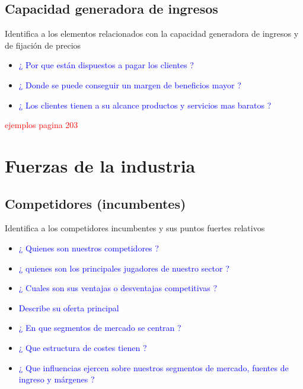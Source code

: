 \documentclass[11pt]{book}
\begin{document}
\subsection{Capacidad generadora de ingresos}
Identifica a los elementos relacionados con la capacidad generadora de ingresos y de fijación de precios
\begin{itemize}
\item\textcolor{blue}{ ¿ Por que están dispuestos a pagar los clientes ? }
\item\textcolor{blue}{ ¿ Donde se puede conseguir un margen de beneficios mayor ? }
\item\textcolor{blue}{ ¿ Los clientes tienen a su alcance productos y servicios mas baratos ? }
\end{itemize}
\textcolor{red}{ejemplos pagina 203}
\section{Fuerzas de la industria}
\subsection{Competidores (incumbentes)}
Identifica a los competidores incumbentes y sus puntos fuertes relativos
\begin{itemize}
\item\textcolor{blue}{¿ Quienes son nuestros competidores ?}
\item\textcolor{blue}{¿ quienes son los principales jugadores de nuestro sector ?}
\item\textcolor{blue}{¿ Cuales son sus ventajas o desventajas competitivas ?}
\item\textcolor{blue}{Describe su oferta principal}
\item\textcolor{blue}{¿ En que segmentos de mercado se centran ?}
\item\textcolor{blue}{¿ Que estructura de costes tienen ?}
\item\textcolor{blue}{¿ Que influencias ejercen sobre nuestros segmentos de mercado, fuentes de ingreso y márgenes ?}
\end{itemize}
\end{document}

